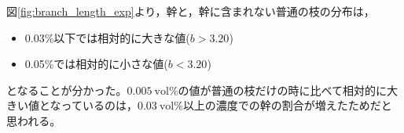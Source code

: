 \documentclass[autodetect-engine,dvi=dvipdfmx,a4paper,ja=standard,oneside,openany,11pt]{bxjsbook}
\begin{document}
図\ref{fig:branch_length_exp}より，幹と，幹に含まれない普通の枝の分布は，
\begin{itemize}
  \item 0.03\%以下では相対的に大きな値($b>3.20$)
  \item 0.05\%では相対的に小さな値($b<3.20$)
\end{itemize}
となることが分かった。$\SI{0.005}{\mathrm{vol}\%}$の値が普通の枝だけの時に比べて相対的に大きい値となっているのは，$\SI{0.03}{\mathrm{vol}\%}$以上の濃度での幹の割合が増えたためだと思われる。
\ifdraft{
  
  
}{}
\end{document}
